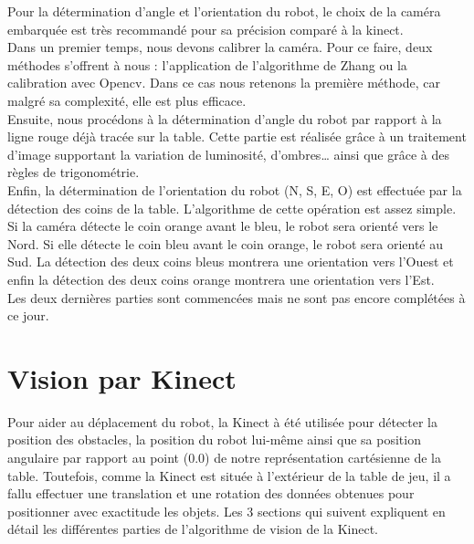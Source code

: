 Pour la détermination d’angle et l’orientation du robot, le choix de la caméra embarquée  est très recommandé pour sa précision comparé à la kinect. \\
Dans un premier temps, nous devons calibrer la caméra. Pour ce faire, deux méthodes s’offrent à nous : l’application de l’algorithme de Zhang ou la calibration avec Opencv. Dans ce cas nous retenons la première méthode, car malgré sa complexité, elle est plus efficace. \\
Ensuite, nous procédons à la détermination d’angle du robot par rapport à la ligne rouge déjà tracée sur la table.  Cette partie est réalisée grâce à un traitement d’image supportant la variation de luminosité, d’ombres… ainsi que grâce à des règles de trigonométrie.\\
Enfin,  la détermination de l’orientation du robot (N, S, E, O) est effectuée par la détection des coins de la table. 
L’algorithme de cette opération est assez simple. Si la caméra détecte le coin orange avant le bleu, le robot sera orienté vers le Nord. Si elle détecte le coin bleu avant le coin orange, le robot sera orienté au Sud. La détection des deux coins bleus montrera une orientation vers l’Ouest et enfin la détection des deux coins orange montrera une orientation vers l’Est.\\
Les deux dernières parties sont commencées mais ne sont pas encore complétées à ce jour.


\section{Vision par Kinect}
Pour aider au déplacement du robot, la Kinect à été utilisée pour détecter la position des obstacles, la position du robot lui-même ainsi que sa position angulaire par rapport au point (0.0) de notre représentation cartésienne de la table. Toutefois, comme la Kinect est située à l'extérieur de la table de jeu, il a fallu effectuer une translation et une rotation des données obtenues pour positionner avec exactitude les objets. Les 3 sections qui suivent expliquent en détail les différentes parties de l'algorithme de vision de la Kinect.

